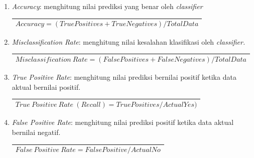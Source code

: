 \begin{enumerate}
	\item
	\textit{Accuracy}:  menghitung nilai prediksi yang benar oleh \textit{classifier}
	\begin{table}[H]
		\small
		\begin{adjustbox}{width=1\textwidth}
			\begin{tabular}{|p{13.55cm}|}
				\hline
				\begin{equation}
				Accuracy=(True Positives+True Negatives)/TotalData
				\end{equation}\\
				\hline
			\end{tabular}
		\end{adjustbox}
	\end{table}
	
	\item
	\textit{Misclassification Rate}: menghitung nilai kesalahan klasifikasi oleh \textit{classifier.} 
	\begin{table}[H]
		\small
		\begin{adjustbox}{width=1\textwidth}
			\begin{tabular}{|p{13.55cm}|}
				\hline
				\begin{equation}
				Misclassification\ Rate=(False Positives+False Negatives)/TotalData
				\end{equation}\\
				\hline
			\end{tabular}
		\end{adjustbox}
	\end{table}	
	
	\item
	\textit{True Positive Rate}: menghitung nilai prediksi bernilai positif ketika data aktual bernilai positif.
	\begin{table}[H]
		\small
		\begin{adjustbox}{width=1\textwidth}
			\begin{tabular}{|p{13.55cm}|}
				\hline
				\begin{equation}
				True \ Positive \ Rate\ (Recall)=True Positives/Actual Yes)
				\end{equation}\\
				\hline
			\end{tabular}
		\end{adjustbox}
	\end{table}
	
	\item
	\textit{False Positive Rate}: menghitung nilai prediksi positif ketika data aktual bernilai negatif.
	\begin{table}[H]
		\small
		\begin{adjustbox}{width=1\textwidth}
			\begin{tabular}{|p{13.55cm}|}
				\hline
				\begin{equation}
				False \ Positive \ Rate=False Positive/Actual No
				\end{equation}\\
				\hline
			\end{tabular}
		\end{adjustbox}
	\end{table}	
	

\end{enumerate}
